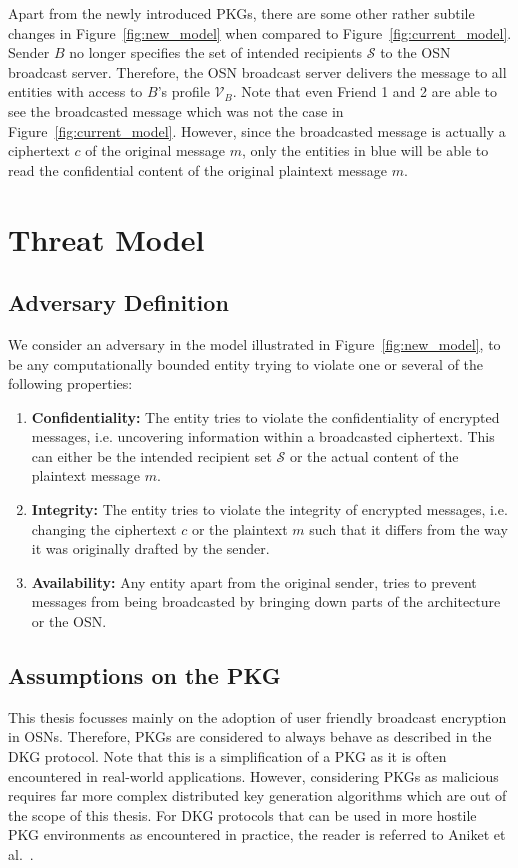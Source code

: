 Apart from the newly introduced PKGs, there are some other rather subtile changes in Figure~\ref{fig:new_model} when compared to Figure~\ref{fig:current_model}. Sender $B$ no longer specifies the set of intended recipients $\mathcal{S}$ to the OSN broadcast server. Therefore, the OSN broadcast server delivers the message to all entities with access to $B$'s profile $\mathcal{V}_B$. Note that even Friend 1 and 2 are able to see the broadcasted message which was not the case in Figure~\ref{fig:current_model}. However, since the broadcasted message is actually a ciphertext $c$ of the original message $m$, only the entities in blue will be able to read the confidential content of the original plaintext message $m$.

\section{Threat Model}

\subsection{Adversary Definition}
We consider an adversary in the model illustrated in Figure~\ref{fig:new_model}, to be any computationally bounded entity trying to violate one or several of the following properties:
\begin{enumerate}
 \item \textbf{Confidentiality:} The entity tries to violate the confidentiality of encrypted messages, i.e. uncovering information within a broadcasted ciphertext. This can either be the intended recipient set $\mathcal{S}$ or the actual content of the plaintext message $m$.
 \item \textbf{Integrity:} The entity tries to violate the integrity of encrypted messages, i.e. changing the ciphertext $c$ or the plaintext $m$ such that it differs from the way it was originally drafted by the sender.
 \item \textbf{Availability:} Any entity apart from the original sender, tries to prevent messages from being broadcasted by bringing down parts of the architecture or the OSN. 
\end{enumerate}

\subsection{Assumptions on the PKG}
This thesis focusses mainly on the adoption of user friendly broadcast encryption in OSNs. Therefore, PKGs are considered to always behave as described in the DKG protocol. Note that this is a simplification of a PKG as it is often encountered in real-world applications. However, considering PKGs as malicious requires far more complex distributed key generation algorithms which are out of the scope of this thesis. For DKG protocols that can be used in more hostile PKG environments as encountered in practice, the reader is referred to Aniket et al.~\cite{art:KateHG12}.


